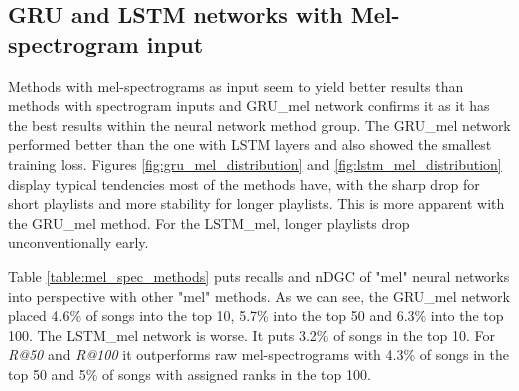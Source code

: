 \subsection{GRU and LSTM networks with Mel-spectrogram input}\label{ssec:GRU_LSTM_mel_results}

Methods with mel-spectrograms as input seem to yield better results than methods with spectrogram inputs and GRU\_mel network confirms it as it has the best results within the neural network method group. The GRU\_mel network performed better than the one with LSTM layers and also showed the smallest training loss. Figures \ref{fig:gru_mel_distribution} and \ref{fig:lstm_mel_distribution} display typical tendencies most of the methods have, with the sharp drop for short playlists and more stability for longer playlists. This is more apparent with the GRU\_mel method. For the LSTM\_mel, longer playlists drop unconventionally early. 

Table \ref{table:mel_spec_methods} puts recalls and nDGC of "mel" neural networks into perspective with other "mel" methods.
As we can see, the GRU\_mel network placed 4.6\% of songs into the top 10, 5.7\% into the top 50 and 6.3\% into the top 100. The LSTM\_mel network is worse. It puts 3.2\% of songs in the top 10. For \textit{R@50} and \textit{R@100} it outperforms raw mel-spectrograms with 4.3\% of songs in the top 50 and 5\% of songs with assigned ranks in the top 100.

